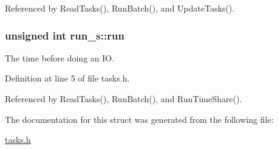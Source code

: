 Referenced by Read\-Tasks(), Run\-Batch(), and Update\-Tasks().

\hypertarget{structrun__s_a1ebaf0153e1c18453f998d4e12781319}{
\subsubsection[{run}]{\setlength{\rightskip}{0pt plus 5cm}unsigned int run\-\_\-s\-::run}}\label{structrun__s_a1ebaf0153e1c18453f998d4e12781319}


The time before doing an I\-O. 



Definition at line 5 of file tasks.\-h.



Referenced by Read\-Tasks(), Run\-Batch(), and Run\-Time\-Share().



The documentation for this struct was generated from the following file\-:\begin{DoxyCompactItemize}
\item 
\hyperlink{tasks_8h}{tasks.\-h}\end{DoxyCompactItemize}
